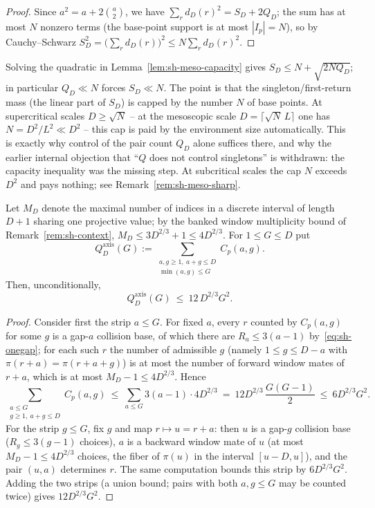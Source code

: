 \begin{proof}
Since $a^2=a+2\binom a2$, we have
$\sum_rd_D(r)^2=S_D+2Q_D$; the sum has at most $N$ nonzero terms
(the base-point support is at most $|I_p|=N$), so by Cauchy--Schwarz
$S_D^2=\bigl(\sum_rd_D(r)\bigr)^2\le N\sum_rd_D(r)^2$.
\end{proof}

\begin{remark}\label{rem:sh-meso-capacity}
Solving the quadratic in Lemma~\ref{lem:sh-meso-capacity} gives
$S_D\le N+\sqrt{2NQ_D}$; in particular $Q_D\ll N$ forces
$S_D\ll N$.  The point is that the singleton/first-return mass (the
linear part of $S_D$) is capped by the number $N$ of base points.  At
supercritical scales $D\ge\sqrt N$ -- at the mesoscopic scale
$D=\lceil\sqrt N\,L\rceil$ one has $N=D^2/L^2\ll D^2$ -- this cap is
paid by the environment size automatically.  This is exactly why
control of the pair count $Q_D$ alone suffices there, and why the
earlier internal objection that ``$Q$ does not control singletons''
is withdrawn: the capacity inequality was the missing step.  At
subcritical scales the cap $N$ exceeds $D^2$ and pays nothing; see
Remark~\ref{rem:sh-meso-sharp}.
\end{remark}

\begin{lemma}\label{lem:sh-meso-axis}
Let $M_D$ denote the maximal number of indices in a discrete interval
of length $D+1$ sharing one projective value; by the banked window
multiplicity bound of Remark~\ref{rem:sh-context},
$M_D\le3D^{2/3}+1\le4D^{2/3}$.  For $1\le G\le D$ put
\[
 Q_D^{\mathrm{axis}}(G)
 :=\sum_{\substack{a,g\ge1,\ a+g\le D\\ \min(a,g)\le G}}C_p(a,g).
\]
Then, unconditionally,
\[
 Q_D^{\mathrm{axis}}(G)\ \le\ 12\,D^{2/3}G^2 .
\]
\end{lemma}

\begin{proof}
Consider first the strip $a\le G$.  For fixed $a$, every $r$ counted
by $C_p(a,g)$ for some $g$ is a gap-$a$ collision base, of which there
are $R_a\le3(a-1)$ by~\eqref{eq:sh-onegap}; for each such $r$ the
number of admissible $g$ (namely $1\le g\le D-a$ with
$\pi(r+a)=\pi(r+a+g)$) is at most the number of forward window mates
of $r+a$, which is at most $M_D-1\le4D^{2/3}$.  Hence
\[
 \sum_{\substack{a\le G\\ g\ge1,\ a+g\le D}}C_p(a,g)
 \ \le\ \sum_{a\le G}3(a-1)\cdot4D^{2/3}
 \ =\ 12D^{2/3}\,\frac{G(G-1)}2\ \le\ 6D^{2/3}G^2 .
\]
For the strip $g\le G$, fix $g$ and map $r\mapsto u=r+a$: then $u$ is
a gap-$g$ collision base ($R_g\le3(g-1)$ choices), $a$ is a backward
window mate of $u$ (at most $M_D-1\le4D^{2/3}$ choices, the fiber of
$\pi(u)$ in the interval $[u-D,u]$), and the pair $(u,a)$ determines
$r$.  The same computation bounds this strip by $6D^{2/3}G^2$.  Adding
the two strips (a union bound; pairs with both $a,g\le G$ may be
counted twice) gives $12D^{2/3}G^2$.
\end{proof}

